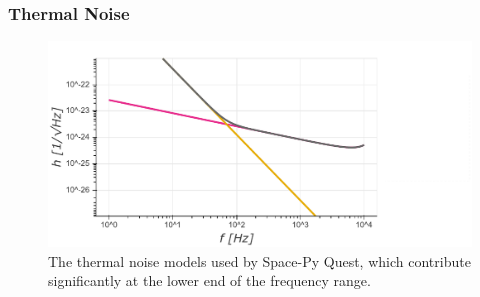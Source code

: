 \documentclass{article}
\begin{document}
   \subsubsection*{Thermal Noise}
    \begin{figure}[h!]
    \centering
    \hspace{2cm}
    \includegraphics[height=0.35\textwidth]{SPQ_thermal.pdf}
    \caption{The thermal noise models used by Space-Py Quest, which contribute significantly at the lower end of the frequency range.}
    \label{fig:thermal}
    \end{figure}
\end{document}
